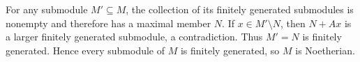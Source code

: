 For any submodule $M'\subseteq M$, the collection of its finitely generated submodules is nonempty and therefore has a maximal member $N$. If $x\in M'\setminus N$, then $N+Ax$ is a larger finitely generated submodule, a contradiction. Thus $M'=N$ is finitely generated. Hence every submodule of $M$ is finitely generated, so $M$ is Noetherian.

